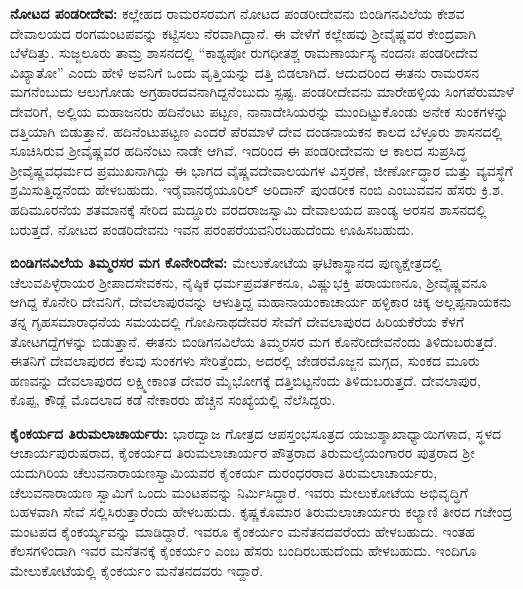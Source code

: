 \textbf{ನೋಟದ ಪಂಡರೀದೇವ:} ಕಲ್ಲೇಹದ ರಾಮರಸರಮಗ ನೋಟದ ಪಂಡರೀದೇವನು ಬಿಂಡಿಗನವಿಲೆಯ ಕೇಶವ ದೇವಾಲಯದ ರಂಗಮಂಟಪವನ್ನು ಕಟ್ಟಿಸಲು ನೆರವಾಗಿದ್ದಾನೆ. ಈ ವೇಳೆಗೆ ಕಲ್ಲೇಹವು ಶ‍್ರೀವೈಷ್ಣವರ ಕೇಂದ್ರವಾಗಿ ಬೆಳೆದಿತ್ತು. ಸುಜ್ಜಲೂರು ತಾಮ್ರ ಶಾಸನದಲ್ಲಿ “ಕಾಶ್ಯಪೋ ರುಗಧೀತಶ್ಚ ರಾಮಣಾರ್ಯಸ್ಯ ನಂದನಃ ಪಂಡರೀದೇವ ವಿಖ್ಯಾತೋ” ಎಂದು ಹೇಳಿ ಅವನಿಗೆ ಒಂದು ವೃತ್ತಿಯನ್ನು ದತ್ತಿ ಬಿಡಲಾಗಿದೆ. ಆದುದರಿಂದ ಈತನು ರಾಮರಸನ ಮಗನೆಂಬುದು ಆಲುಗೋಡು ಅಗ್ರಹಾರದವನಾಗಿದ್ದನೆಂಬುದು ಸ್ಪಷ್ಟ. ಪಂಡರೀದೇವನು ಮಾರೇಹಳ್ಳಿಯ ಸಿಂಗಪೆರುಮಾಳೆ ದೇವರಿಗೆ, ಅಲ್ಲಿಯ ಮಹಾಜನರು ಹದಿನೆಂಟು ಪಟ್ಟಣ, ನಾನಾದೇಸಿಯರನ್ನು ಮುಂದಿಟ್ಟುಕೊಂಡು ಅನೇಕ ಸುಂಕಗಳನ್ನು ದತ್ತಿಯಾಗಿ ಬಿಡುತ್ತಾನೆ. ಹದಿನೆಂಟುಪಟ್ಟಣ ಎಂದರೆ ಪೆರಮಾಳೆ ದೇವ ದಂಡನಾಯಕನ ಕಾಲದ ಬೆಳ್ಳೂರು ಶಾಸನದಲ್ಲಿ ಸೂಚಿಸಿರುವ ಶ‍್ರೀವೈಷ್ಣವರ ಹದಿನೆಂಟು ನಾಡೇ ಆಗಿವೆ. ಇದರಿಂದ ಈ ಪಂಡರೀದೇವನು ಆ ಕಾಲದ ಸುಪ್ರಸಿದ್ಧ ಶ‍್ರೀವೈಷ್ಣವಧರ್ಮದ ಪ್ರಮುಖನಾಗಿದ್ದು ಈ ಭಾಗದ ವೈಷ್ಣವದೇವಾಲಯಗಳ ವಿಸ್ತರಣೆ, ಜೀರ್ಣೋದ್ಧಾರ ಮತ್ತು ವ್ಯವಸ್ಥೆಗೆ ಶ್ರಮಿಸುತ್ತಿದ್ದನೆಂದು ಹೇಳಬಹುದು. ಇರೈವಾನರೈಯೂರಿಲ್​ ಅರಿದಾನ್​ ಪುಂಡರೀಕ ನಂಬಿ ಎಂಬುವವನ ಹೆಸರು ಕ್ರಿ.ಶ. ಹದಿಮೂರನೆಯ ಶತಮಾನಕ್ಕೆ ಸೇರಿದ ಮದ್ದೂರು ವರದರಾಜಸ್ವಾಮಿ ದೇವಾಲಯದ ಪಾಂಡ್ಯ ಅರಸನ ಶಾಸನದಲ್ಲಿ ಬರುತ್ತದೆ. ನೋಟದ ಪಂಡರಿದೇವನು ಇವನ ಪರಂಪರೆಯವನಿರಬಹುದೆಂದು ಊಹಿಸಬಹುದು.

\textbf{ಬಿಂಡಿಗನವಿಲೆಯ ತಿಮ್ಮರಸರ ಮಗ ಕೊನೇರಿದೇವ:} ಮೇಲುಕೋಟೆಯ ಘಟಿಕಾಸ್ಥಾನದ ಪುಣ್ಯಕ್ಷೇತ್ರದಲ್ಲಿ ಚೆಲುವಪಿಳ್ಳೆರಾಯರ ಶ‍್ರೀಪಾದಸೇವಕನು, ನೈಷ್ಠಿಕ ಧರ್ಮಪ್ರವರ್ತಕನೂ, ವಿಷ್ಣುಭಕ್ತಿ ಪರಾಯಣನೂ, ಶ‍್ರೀವೈಷ್ಣವನೂ ಆಗಿದ್ದ ಕೊನೇರಿ ದೇವನಿಗೆ, ದೇವಲಾಪುರವನ್ನು ಆಳುತ್ತಿದ್ದ ಮಹಾನಾಯಂಕಾಚಾರ್ಯ ಹಳ್ಳಿಕಾರ ಚಿಕ್ಕ ಅಲ್ಲಪ್ಪನಾಯಕನು ತನ್ನ ಗೃಹಸಮಾರಾಧನೆಯ ಸಮಯದಲ್ಲಿ ಗೋಪಿನಾಥದೇವರ ಸೇವೆಗೆ ದೇವಲಾಪುರದ ಹಿರಿಯಕೆರೆಯ ಕೆಳಗೆ ತೋಟಗದ್ದೆಗಳನ್ನು ಬಿಡುತ್ತಾನೆ. ಈತನು ಬಿಂಡಿಗನವಿಲೆಯ ತಿಮ್ಮರಸರ ಮಗ ಕೊನೆರೀದೇವನೆಂದು ತಿಳಿದುಬರುತ್ತದೆ. ಈತನಿಗೆ ದೇವಲಾಪುರದ ಕೆಲವು ಸುಂಕಗಳು ಸೇರಿತ್ತೆಂದು, ಅದರಲ್ಲಿ ಜೇಡರಮೊಜ್ಜನ ಮಗ್ಗದ, ಸುಂಕದ ಮೂರು ಹಣವನ್ನು ದೇವಲಾಪುರದ ಲಕ್ಷ್ಮೀಕಾಂತ ದೇವರ ಮೈಭೋಗಕ್ಕೆ ದತ್ತಿಬಿಟ್ಟನೆಂದು ತಿಳಿದುಬರುತ್ತದೆ. ದೇವಲಾಪುರ, ಕೊಪ್ಪ, ಕೌಡ್ಲೆ ಮೊದಲಾದ ಕಡೆ ನೇಕಾರರು ಹೆಚ್ಚಿನ ಸಂಖ್ಯೆಯಲ್ಲಿ ನೆಲೆಸಿದ್ದರು.

\textbf{ಕೈಂಕರ್ಯದ ತಿರುಮಲಾಚಾರ್ಯರು:} ಭಾರದ್ವಾಜ ಗೋತ್ರದ ಆಪಸ್ತಂಭಸೂತ್ರದ ಯಜುಶ್ಶಾಖಾಧ್ಯಾಯಿಗಳಾದ, ಸ್ಥಳದ ಆಚಾರ್ಯಪುರುಷರಾದ, ಕೈಂಕರ್ಯದ ತಿರುಮಲಾಚಾರ್ಯರ ಪೌತ್ರರಾದ ತಿರುಮಲೈಯಂಗಾರರ ಪುತ್ರರಾದ ಶ‍್ರೀ ಯದುಗಿರಿಯ ಚೆಲುವನಾರಾಯಣಸ್ವಾಮಿಯವರ ಕೈಂಕರ್ಯ ದುರಂಧರರಾದ ತಿರುಮಲಾಚಾರ್ಯರು, ಚೆಲುವನಾರಾಯಣ ಸ್ವಾಮಿಗೆ ಒಂದು ಮಂಟಪವನ್ನು ನಿರ್ಮಿಸಿದ್ದಾರೆ. ಇವರು ಮೇಲುಕೋಟೆಯ ಅಭಿವೃದ್ಧಿಗೆ ಬಹಳವಾಗಿ ಸೇವೆ ಸಲ್ಲಿಸಿರುತ್ತಾರೆಂದು ಹೇಳಬಹುದು. ಕೃಷ್ಣಕೊಮಾರ ತಿರುಮಲಾಚಾರ್ಯರು ಕಲ್ಯಾಣಿ ತೀರದ ಗಜೇಂದ್ರ ಮಂಟಪದ ಕೈಂಕರ್ಯ್ಯವನ್ನು ಮಾಡಿದ್ದಾರೆ. ಇವರೂ ಕೈಂಕರ್ಯಂ ಮನೆತನದವರೆಂದು ಹೇಳಬಹುದು. ಇಂತಹ ಕೆಲಸಗಳಿಂದಾಗಿ ಇವರ ಮನೆತನಕ್ಕೆ ಕೈಂಕರ್ಯಂ ಎಂಬ ಹೆಸರು ಬಂದಿರಬಹುದೆಂದು ಹೇಳಬಹುದು. ಇಂದಿಗೂ ಮೇಲುಕೋಟೆಯಲ್ಲಿ ಕೈಂಕರ್ಯಂ ಮನೆತನದವರು ಇದ್ದಾರೆ.

